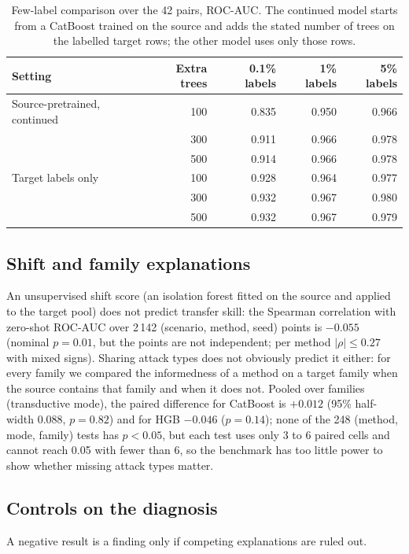\documentclass[pdflatex,sn-mathphys-num]{sn-jnl}%
\begin{document}
\begin{table}[htbp]
\centering\small
\caption{Few-label comparison over the 42 pairs, ROC-AUC. The continued model starts from a CatBoost trained on the source and adds the stated number of trees on the labelled target rows; the other model uses only those rows.}\label{tab:fewshot}
{\scriptsize\setlength{\tabcolsep}{2.5pt}\begin{tabular}{lrrrr}
\toprule
Setting & Extra trees & 0.1\% labels & 1\% labels & 5\% labels \\
\midrule
Source-pretrained, continued & 100 & 0.835 & 0.950 & 0.966 \\
 & 300 & 0.911 & 0.966 & 0.978 \\
 & 500 & 0.914 & 0.966 & 0.978 \\
Target labels only & 100 & 0.928 & 0.964 & 0.977 \\
 & 300 & 0.932 & 0.967 & 0.980 \\
 & 500 & 0.932 & 0.967 & 0.979 \\
\bottomrule
\end{tabular}}
\end{table}

\subsection{Shift and family explanations}
An unsupervised shift score (an isolation forest fitted on the source and applied to the target pool) does not predict transfer skill: the Spearman correlation with zero-shot ROC-AUC over 2\,142 (scenario, method, seed) points is $-0.055$ (nominal $p=0.01$, but the points are not independent; per method $|\rho|\le0.27$ with mixed signs).
Sharing attack types does not obviously predict it either: for every family we compared the informedness of a method on a target family when the source contains that family and when it does not.
Pooled over families (transductive mode), the paired difference for CatBoost is $+0.012$ (95\% half-width 0.088, $p=0.82$) and for HGB $-0.046$ ($p=0.14$); none of the 248 (method, mode, family) tests has $p<0.05$, but each test uses only 3 to 6 paired cells and cannot reach 0.05 with fewer than 6, so the benchmark has too little power to show whether missing attack types matter.

\subsection{Controls on the diagnosis}\label{sec:diag}
A negative result is a finding only if competing explanations are ruled out.
\end{document}
